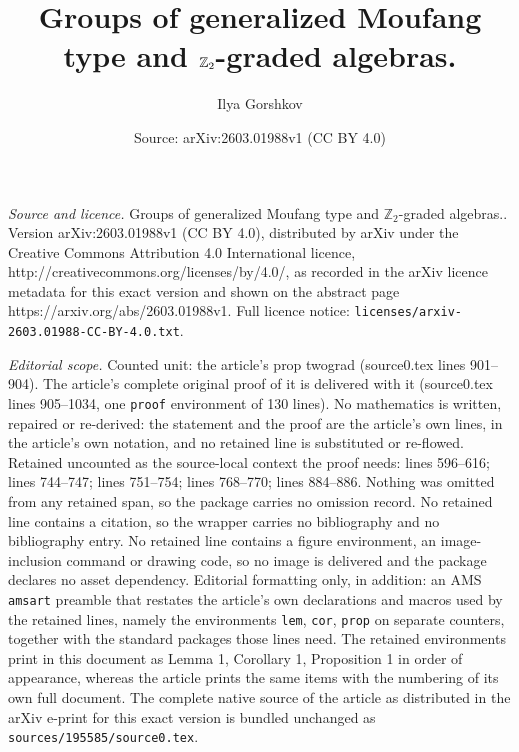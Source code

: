 \documentclass[10pt,a4paper]{amsart}
\title{Groups of generalized Moufang type and $\Z_2$-graded algebras.}
\author{Ilya Gorshkov}
\date{Source: arXiv:2603.01988v1 (CC BY 4.0)}
\newcommand\Z{\mathbb{Z}}
\begin{document}
\maketitle

\noindent\emph{Source and licence.} Groups of generalized Moufang type and $\Z_2$-graded algebras.. Version arXiv:2603.01988v1 (CC BY 4.0), distributed by arXiv under the Creative Commons Attribution 4.0 International licence, http://creativecommons.org/licenses/by/4.0/, as recorded in the arXiv licence metadata for this exact version and shown on the abstract page https://arxiv.org/abs/2603.01988v1. Full licence notice: \texttt{licenses/arxiv-2603.01988-CC-BY-4.0.txt}.\par\smallskip

\noindent\textit{Editorial scope.} Counted unit: the article's prop twograd (source0.tex lines 901--904). The article's complete original proof of it is delivered with it (source0.tex lines 905--1034, one \texttt{proof} environment of 130 lines). No mathematics is written, repaired or re-derived: the statement and the proof are the article's own lines, in the article's own notation, and no retained line is substituted or re-flowed.  Retained uncounted as the source-local context the proof needs: lines 596--616; lines 744--747; lines 751--754; lines 768--770; lines 884--886.  Nothing was omitted from any retained span, so the package carries no omission record.  No retained line contains a citation, so the wrapper carries no bibliography and no bibliography entry.  No retained line contains a figure environment, an image-inclusion command or drawing code, so no image is delivered and the package declares no asset dependency.  Editorial formatting only, in addition: an AMS \texttt{amsart} preamble that restates the article's own declarations and macros used by the retained lines, namely the environments \texttt{lem}, \texttt{cor}, \texttt{prop} on separate counters, together with the standard packages those lines need.  The retained environments print in this document as Lemma 1, Corollary 1, Proposition 1 in order of appearance, whereas the article prints the same items with the numbering of its own full document.  The complete native source of the article as distributed in the arXiv e-print for this exact version is bundled unchanged as \texttt{sources/195585/source0.tex}.
\end{document}
